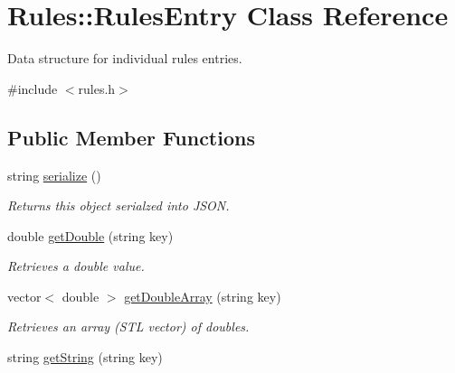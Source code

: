 \hypertarget{class_rules_1_1_rules_entry}{\section{Rules\-:\-:Rules\-Entry Class Reference}
\label{class_rules_1_1_rules_entry}
}


Data structure for individual rules entries.  




{\ttfamily \#include $<$rules.\-h$>$}

\subsection*{Public Member Functions}
\begin{DoxyCompactItemize}
\item 
\hypertarget{class_rules_1_1_rules_entry_a91020a700e127c987bb3e3ead691bd58}{string \hyperlink{class_rules_1_1_rules_entry_a91020a700e127c987bb3e3ead691bd58}{serialize} ()}\label{class_rules_1_1_rules_entry_a91020a700e127c987bb3e3ead691bd58}

\begin{DoxyCompactList}\small\item\em Returns this object serialzed into J\-S\-O\-N. \end{DoxyCompactList}\item 
\hypertarget{class_rules_1_1_rules_entry_a2f99374de5ede77863da9b1d4cd08d4f}{double \hyperlink{class_rules_1_1_rules_entry_a2f99374de5ede77863da9b1d4cd08d4f}{get\-Double} (string key)}\label{class_rules_1_1_rules_entry_a2f99374de5ede77863da9b1d4cd08d4f}

\begin{DoxyCompactList}\small\item\em Retrieves a double value. \end{DoxyCompactList}\item 
\hypertarget{class_rules_1_1_rules_entry_a05f0d8866f6b0ae879ffb4e38dcb0310}{vector$<$ double $>$ \hyperlink{class_rules_1_1_rules_entry_a05f0d8866f6b0ae879ffb4e38dcb0310}{get\-Double\-Array} (string key)}\label{class_rules_1_1_rules_entry_a05f0d8866f6b0ae879ffb4e38dcb0310}

\begin{DoxyCompactList}\small\item\em Retrieves an array (S\-T\-L vector) of doubles. \end{DoxyCompactList}\item 
\hypertarget{class_rules_1_1_rules_entry_a40e98b4ff0c57c8852e2572d56535d64}{string \hyperlink{class_rules_1_1_rules_entry_a40e98b4ff0c57c8852e2572d56535d64}{get\-String} (string key)}\label{class_rules_1_1_rules_entry_a40e98b4ff0c57c8852e2572d56535d64}


\end{DoxyCompactItemize}
